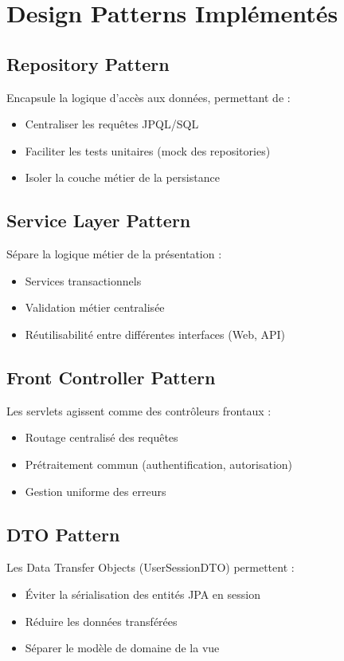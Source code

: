 \documentclass[12pt,a4paper,twoside]{report}
\begin{document}
\section{Design Patterns Implémentés}

\subsection{Repository Pattern}

Encapsule la logique d'accès aux données, permettant de :
\begin{itemize}
    \item Centraliser les requêtes JPQL/SQL
    \item Faciliter les tests unitaires (mock des repositories)
    \item Isoler la couche métier de la persistance
\end{itemize}

\subsection{Service Layer Pattern}

Sépare la logique métier de la présentation :
\begin{itemize}
    \item Services transactionnels
    \item Validation métier centralisée
    \item Réutilisabilité entre différentes interfaces (Web, API)
\end{itemize}

\subsection{Front Controller Pattern}

Les servlets agissent comme des contrôleurs frontaux :
\begin{itemize}
    \item Routage centralisé des requêtes
    \item Prétraitement commun (authentification, autorisation)
    \item Gestion uniforme des erreurs
\end{itemize}

\subsection{DTO Pattern}

Les Data Transfer Objects (UserSessionDTO) permettent :
\begin{itemize}
    \item Éviter la sérialisation des entités JPA en session
    \item Réduire les données transférées
    \item Séparer le modèle de domaine de la vue
\end{itemize}
\end{document}
